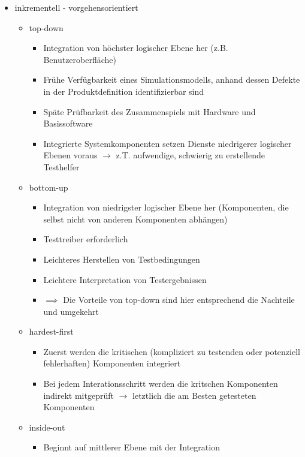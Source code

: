 \documentclass{article}
\begin{document}
\begin{itemize}
\begin{itemize}
\begin{itemize}
    \end{itemize}
  \end{itemize}
  \begin{itemize}
    \item inkrementell - vorgehensorientiert
    \begin{itemize}
      \item top-down
      \begin{itemize}
        \item Integration von höchster logischer Ebene her (z.B. Benutzeroberfläche)
        \item Frühe Verfügbarkeit eines Simulationsmodells, anhand dessen Defekte in der Produktdefinition identifizierbar sind
        \item Späte Prüfbarkeit des Zusammenspiels mit Hardware und Basissoftware
        \item Integrierte Systemkomponenten setzen Dienste niedrigerer logischer Ebenen voraus $\to$ z.T. aufwendige, schwierig zu erstellende Testhelfer
      \end{itemize}
      \item bottom-up
      \begin{itemize}
        \item Integration von niedrigster logischer Ebene her (Komponenten, die selbst nicht von anderen Komponenten abhängen)
        \item Testtreiber erforderlich
        \item Leichteres Herstellen von Testbedingungen
        \item Leichtere Interpretation von Testergebnissen
        \item $\implies$ Die Vorteile von top-down sind hier entsprechend die Nachteile und umgekehrt
      \end{itemize}
      \item hardest-first
      \begin{itemize}
        \item Zuerst werden die kritischen (kompliziert zu testenden oder potenziell fehlerhaften) Komponenten integriert
        \item Bei jedem Interationsschritt werden die kritschen Komponenten indirekt mitgeprüft $\to$ letztlich die am Besten getesteten Komponenten
      \end{itemize}
      \item inside-out
      \begin{itemize}
        \item Beginnt auf mittlerer Ebene mit der Integration

\end{itemize}
\end{itemize}
\end{itemize}
\end{itemize}
\end{document}
